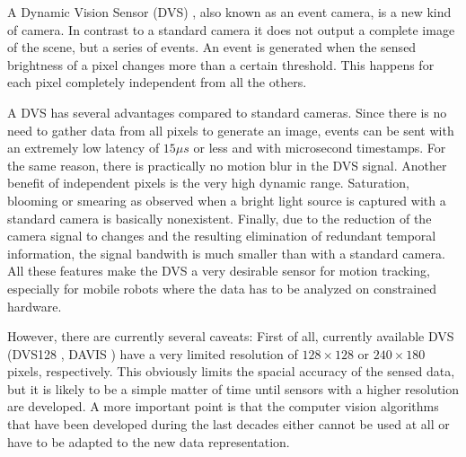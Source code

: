 A Dynamic Vision Sensor (DVS) \cite{lpd08dvs}, also known as an event camera,
is a new kind of camera. In contrast to a standard camera it does not output a
complete image of the scene, but a series of events. An event is generated when
the sensed brightness of a pixel changes more than a certain threshold. This
happens for each pixel completely independent from all the others.

A DVS has several advantages compared to standard cameras. Since there is no
need to gather data from all pixels to generate an image, events can be sent
with an extremely low latency of $15 \mu s$ or less \cite{lpd08dvs, brandli14davis} and
with microsecond timestamps.  For the same reason, there is practically no
motion blur in the DVS signal.  Another benefit of independent pixels is the
very high dynamic range.  Saturation, blooming or smearing as observed when a
bright light source is captured with a standard camera is basically
nonexistent. Finally, due to the reduction of the camera signal to changes and
the resulting elimination of redundant temporal information, the signal
bandwith is much smaller than with a standard camera.
All these features make the DVS a very desirable sensor for motion tracking,
especially for mobile robots where the data has to be analyzed on constrained
hardware.

However, there are currently several caveats: First of all, currently available
DVS (DVS128 \cite{lpd08dvs}, DAVIS \cite{brandli14davis}) have a very limited
resolution of $128 \times 128$ or $240 \times 180$ pixels, respectively. This
obviously limits the spacial accuracy of the sensed data, but it is likely to
be a simple matter of time until sensors with a higher resolution are
developed. A more important point is that the computer vision algorithms that
have been developed during the last decades either cannot be used at all or
have to be adapted to the new data representation.
